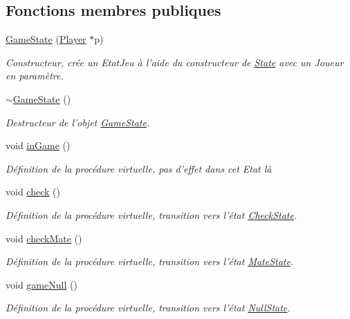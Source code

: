 \subsection*{Fonctions membres publiques}
\begin{DoxyCompactItemize}
\item 
\hyperlink{class_game_state_a564f9ae19ac9980b28b78944645b5163}{Game\-State} (\hyperlink{class_player}{Player} $\ast$p)
\begin{DoxyCompactList}\small\item\em Constructeur, crée un Etat\-Jeu à l'aide du constructeur de \hyperlink{class_state}{State} avec un Joueur en paramètre. \end{DoxyCompactList}\item 
\hyperlink{class_game_state_ae623df5042cd0c17daa3394fdcb397b3}{$\sim$\-Game\-State} ()
\begin{DoxyCompactList}\small\item\em Destructeur de l'objet \hyperlink{class_game_state}{Game\-State}. \end{DoxyCompactList}\item 
void \hyperlink{class_game_state_af0290fd87a2bc2a44119dc700d8b8721}{in\-Game} ()
\begin{DoxyCompactList}\small\item\em Définition de la procédure virtuelle, pas d'effet dans cet Etat là \end{DoxyCompactList}\item 
void \hyperlink{class_game_state_a646e5436c4191f323dfa736a06e79695}{check} ()
\begin{DoxyCompactList}\small\item\em Définition de la procédure virtuelle, transition vers l'état \hyperlink{class_check_state}{Check\-State}. \end{DoxyCompactList}\item 
void \hyperlink{class_game_state_ada8cd91a048922c4d8aedbef17ce6fbc}{check\-Mate} ()
\begin{DoxyCompactList}\small\item\em Définition de la procédure virtuelle, transition vers l'état \hyperlink{class_mate_state}{Mate\-State}. \end{DoxyCompactList}\item 
void \hyperlink{class_game_state_a006f729bc30cfa224d3235c87e5a6e59}{game\-Null} ()
\begin{DoxyCompactList}\small\item\em Définition de la procédure virtuelle, transition vers l'état \hyperlink{class_null_state}{Null\-State}. \end{DoxyCompactList}\item 

\end{DoxyCompactItemize}
